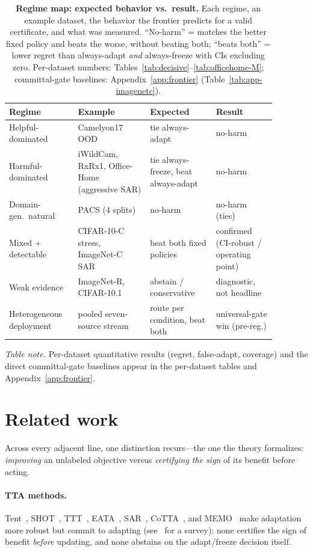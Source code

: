 \documentclass[conference]{IEEEtran}
\theoremstyle{plain}
\theoremstyle{definition}
\theoremstyle{remark}
\begin{document}
\begin{table}[t]\centering\footnotesize
\caption{\textbf{Regime map: expected behavior vs.\ result.} Each regime, an example dataset, the
behavior the frontier predicts for a valid certificate, and what was measured. ``No-harm'' =
matches the better fixed policy and beats the worse, without beating both; ``beats both'' = lower
regret than always-adapt \emph{and} always-freeze with CIs excluding zero. Per-dataset numbers:
Tables~\ref{tab:decisive}--\ref{tab:officehome-M}; committal-gate baselines:
Appendix~\ref{app:frontier} (Table~\ref{tab:app-imagenetc}).}
\label{tab:regime-summary}
\begin{tabular}{@{}p{0.22\linewidth}p{0.24\linewidth}p{0.22\linewidth}p{0.2\linewidth}@{}}
\toprule
Regime & Example & Expected & Result \\
\midrule
Helpful-dominated & Camelyon17 OOD & tie always-adapt & no-harm \\
Harmful-dominated & iWildCam, RxRx1, Office-Home (aggressive SAR) & tie always-freeze, beat always-adapt & no-harm \\
Domain-gen.\ natural & PACS (4 splits) & no-harm & no-harm (ties) \\
Mixed + detectable & CIFAR-10-C stress, ImageNet-C SAR & beat both fixed policies & confirmed (CI-robust / operating point) \\
Weak evidence & ImageNet-R, CIFAR-10.1 & abstain / conservative & diagnostic, not headline \\
Heterogeneous deployment & pooled seven-source stream & route per condition, beat both & universal-gate win (pre-reg.) \\
\bottomrule
\end{tabular}
\end{table}

\noindent\emph{Table note.} Per-dataset quantitative results (regret, false-adapt, coverage) and
the direct committal-gate baselines appear in the per-dataset tables and
Appendix~\ref{app:frontier}.

\section{Related work}
Across every adjacent line, one distinction recurs---the one the theory formalizes:
\emph{improving} an unlabeled objective versus \emph{certifying the sign} of its benefit
before acting.

\paragraph{TTA methods.}
Tent~\cite{wang2021tent}, SHOT~\cite{liang2020shot}, TTT~\cite{sun2020ttt}, EATA~\cite{niu2022eata},
SAR~\cite{niu2023sar}, CoTTA~\cite{wang2022cotta}, and MEMO~\cite{zhang2022memo} make adaptation
more robust but commit to adapting (see~\cite{liang2025ttasurvey} for a survey); none certifies
the sign of benefit \emph{before} updating, and none abstains on the adapt/freeze decision itself.
\end{document}

